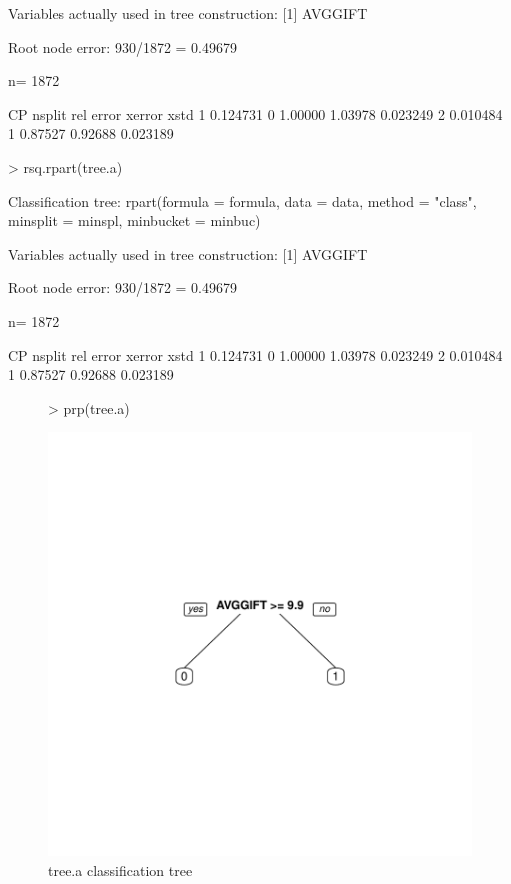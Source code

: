 \documentclass{article}
\begin{document}
\begin{Schunk}
\begin{Soutput}
Variables actually used in tree construction:
[1] AVGGIFT

Root node error: 930/1872 = 0.49679

n= 1872 

        CP nsplit rel error  xerror     xstd
1 0.124731      0   1.00000 1.03978 0.023249
2 0.010484      1   0.87527 0.92688 0.023189
\end{Soutput}
\begin{Sinput}
> rsq.rpart(tree.a)
\end{Sinput}
\begin{Soutput}
Classification tree:
rpart(formula = formula, data = data, method = "class", minsplit = minspl, 
    minbucket = minbuc)

Variables actually used in tree construction:
[1] AVGGIFT

Root node error: 930/1872 = 0.49679

n= 1872 

        CP nsplit rel error  xerror     xstd
1 0.124731      0   1.00000 1.03978 0.023249
2 0.010484      1   0.87527 0.92688 0.023189
\end{Soutput}
\end{Schunk}

\begin{figure}
\begin{center}
\begin{Schunk}
\begin{Sinput}
> prp(tree.a)
\end{Sinput}
\end{Schunk}
\includegraphics{DirectMailPrediction-012}
\end{center}
\caption{tree.a classification tree}
\label{classt-a}
\end{figure}
\end{document}
